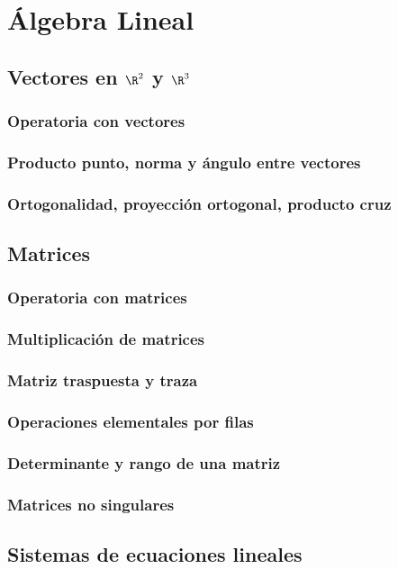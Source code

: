 \section{Álgebra Lineal}

\subsection{Vectores en $\R^2$ y $\R^3$}

\subsubsection{Operatoria con vectores}

\subsubsection{Producto punto, norma y ángulo entre vectores}

\subsubsection{Ortogonalidad, proyección ortogonal, producto cruz}

\subsection{Matrices}

\subsubsection{Operatoria con matrices}

\subsubsection{Multiplicación de matrices}

\subsubsection{Matriz traspuesta y traza}

\subsubsection{Operaciones elementales por filas}

\subsubsection{Determinante y rango de una matriz}

\subsubsection{Matrices no singulares}

\subsection{Sistemas de ecuaciones lineales}
